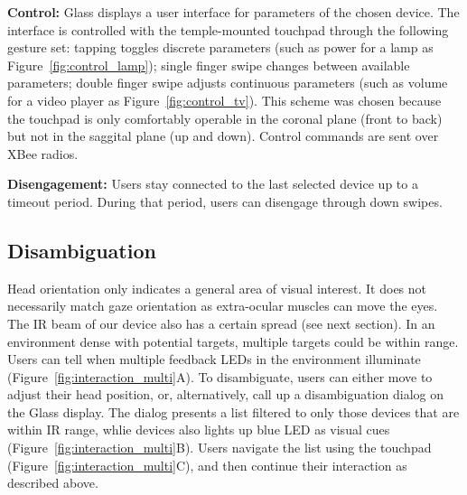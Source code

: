 {\bf Control:} Glass displays a user interface for parameters of the chosen device. The interface is controlled with the temple-mounted touchpad through the following gesture set: tapping toggles discrete parameters (such as power for a lamp as Figure~\ref{fig:control_lamp}); single finger swipe changes between available parameters; double finger swipe adjusts continuous parameters (such as volume for a video player as Figure~\ref{fig:control_tv}). This scheme was chosen because the touchpad is only comfortably operable in the coronal plane (front to back) but not in the saggital plane (up and down). 
Control commands are sent over XBee radios.

{\bf Disengagement:} Users stay connected to the last selected device up to a timeout period. During that period, users can disengage through down swipes.

\subsection{Disambiguation}
Head orientation only indicates a general area of visual interest. It does not necessarily match gaze orientation as extra-ocular muscles can move the eyes. The IR beam of our device also has a certain spread (see next section). In an environment dense with potential targets, multiple targets could be within range. Users can tell when multiple feedback LEDs in the environment illuminate (Figure~\ref{fig:interaction_multi}A). To disambiguate, users can either move to adjust their head position, or, alternatively, call up a disambiguation dialog on the Glass display. The dialog presents a list filtered to only those devices that are within IR range, whlie devices also lights up blue LED as visual cues (Figure~\ref{fig:interaction_multi}B). Users navigate the list using the touchpad (Figure~\ref{fig:interaction_multi}C), and then continue their interaction as described above.
